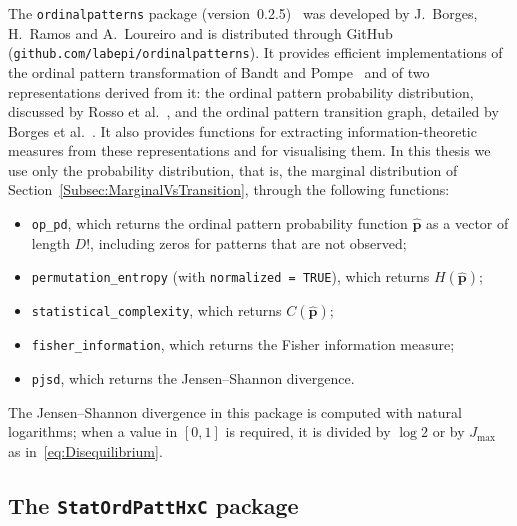 The \texttt{ordinalpatterns} package (version~0.2.5)~\cite{ordinalpatterns} was developed by J.~Borges, H.~Ramos and A.~Loureiro and is distributed through GitHub (\texttt{github.com/labepi/ordinalpatterns}). It provides efficient implementations of the ordinal pattern transformation of Bandt and Pompe~\cite{PhysRevLett.88.174102} and of two representations derived from it: the ordinal pattern probability distribution, discussed by Rosso et al.~\cite{Rosso2007}, and the ordinal pattern transition graph, detailed by Borges et al.~\cite{Borges2019}. It also provides functions for extracting information-theoretic measures from these representations and for visualising them. In this thesis we use only the probability distribution, that is, the marginal distribution of Section~\ref{Subsec:MarginalVsTransition}, through the following functions:
\begin{itemize}
	\item \texttt{op\_pd}, which returns the ordinal pattern probability function $\widehat{\mathbf{p}}$ as a vector of length $D!$, including zeros for patterns that are not observed;
	\item \texttt{permutation\_entropy} (with \texttt{normalized = TRUE}), which returns $H(\widehat{\mathbf{p}})$;
	\item \texttt{statistical\_complexity}, which returns $C(\widehat{\mathbf{p}})$;
	\item \texttt{fisher\_information}, which returns the Fisher information measure;
	\item \texttt{pjsd}, which returns the Jensen--Shannon divergence.
\end{itemize}
The Jensen--Shannon divergence in this package is computed with natural logarithms; when a value in $[0,1]$ is required, it is divided by $\log 2$ or by $J_{\max}$ as in~\eqref{eq:Disequilibrium}.

\subsection{The \texttt{StatOrdPattHxC} package}

